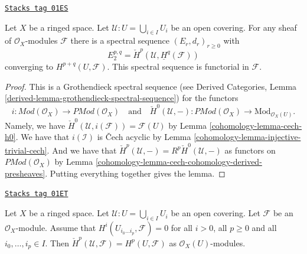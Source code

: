 \begin{lemma}
\label{cohomology-lemma-cech-spectral-sequence}
\href{https://stacks.math.columbia.edu/tag/01ES}{\texttt{Stacks tag 01ES}}

Let $X$ be a ringed space.
Let $\mathcal{U} : U = \bigcup_{i \in I} U_i$ be an open covering.
For any sheaf of $\mathcal{O}_X$-modules $\mathcal{F}$ there
is a spectral sequence $(E_r, d_r)_{r \geq 0}$ with
$$
E_2^{p, q} = \check{H}^p(\mathcal{U}, \underline{H}^q(\mathcal{F}))
$$
converging to $H^{p + q}(U, \mathcal{F})$.
This spectral sequence is functorial in $\mathcal{F}$.
\end{lemma}

\begin{proof}

This is a Grothendieck spectral sequence
(see
Derived Categories, Lemma \ref{derived-lemma-grothendieck-spectral-sequence})
for the functors
$$
i :  \textit{Mod}(\mathcal{O}_X) \to \textit{PMod}(\mathcal{O}_X)
\quad\text{and}\quad
\check{H}^0(\mathcal{U}, - ) : \textit{PMod}(\mathcal{O}_X)
\to \text{Mod}_{\mathcal{O}_X(U)}.
$$
Namely, we have $\check{H}^0(\mathcal{U}, i(\mathcal{F})) = \mathcal{F}(U)$
by Lemma \ref{cohomology-lemma-cech-h0}. We have that $i(\mathcal{I})$ is
{\v C}ech acyclic by Lemma \ref{cohomology-lemma-injective-trivial-cech}. And we
have that $\check{H}^p(\mathcal{U}, -) = R^p\check{H}^0(\mathcal{U}, -)$
as functors on $\textit{PMod}(\mathcal{O}_X)$
by Lemma \ref{cohomology-lemma-cech-cohomology-derived-presheaves}.
Putting everything together gives the lemma.
\end{proof}

\begin{lemma}
\label{cohomology-lemma-cech-spectral-sequence-application}
\href{https://stacks.math.columbia.edu/tag/01ET}{\texttt{Stacks tag 01ET}}

Let $X$ be a ringed space.
Let $\mathcal{U} : U = \bigcup_{i \in I} U_i$ be an open covering.
Let $\mathcal{F}$ be an $\mathcal{O}_X$-module.
Assume that $H^i(U_{i_0 \ldots i_p}, \mathcal{F}) = 0$
for all $i > 0$, all $p \geq 0$ and all $i_0, \ldots, i_p \in I$.
Then $\check{H}^p(\mathcal{U}, \mathcal{F}) = H^p(U, \mathcal{F})$
as $\mathcal{O}_X(U)$-modules.
\end{lemma}

